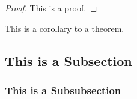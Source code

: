 \documentclass{article}
\begin{document}
\begin{proof}
This is a proof.
%
\end{proof}

\begin{cor}
This is a corollary to a theorem.
%
\end{cor}

\lipsum[1-5]

\subsection{This is a Subsection}

\lipsum[6-10]

\subsubsection{This is a Subsubsection}
\lipsum[11-20]

\nocite{*}
\printbibliography

\end{document}
